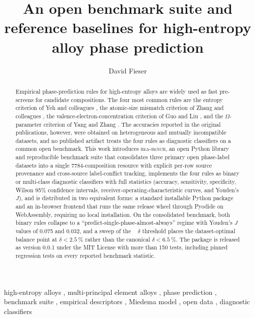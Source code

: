 \documentclass[review,times,nonatbib]{elsarticle}
\newcommand{\Omegaparam}{\ensuremath{\Omega}}
\newcommand{\hea}{\textsc{hea-bench}\xspace}
\begin{document}
\begin{frontmatter}

\title{%
  An open benchmark suite and reference baselines for high-entropy
  alloy phase prediction
}

\author[1]{David Fieser}

\address[1]{Department of Mechanical and Aerospace, University of
Tennessee Knoxville, 1512 Middle Drive, Knoxville, TN 37996, USA.
ORCID \href{https://orcid.org/0009-0007-5754-4331}{0009-0007-5754-4331}}

\begin{abstract}
Empirical phase-prediction rules for high-entropy alloys are widely
used as fast pre-screens for candidate compositions. The four most
common rules are the entropy criterion of Yeh and colleagues
\cite{yeh2004}, the atomic-size mismatch criterion of Zhang and
colleagues \cite{zhang2008}, the valence-electron-concentration
criterion of Guo and Liu \cite{guo2011}, and the
\Omegaparam{}-parameter criterion of Yang and Zhang \cite{yang2012}.
The accuracies reported in the original publications, however, were
obtained on heterogeneous and mutually incompatible datasets, and
no published artifact treats the four rules as diagnostic
classifiers on a common open benchmark. This work introduces
\hea{}, an open Python library and reproducible benchmark suite
that consolidates three primary open phase-label datasets into a
single \num{7784}-composition resource with explicit per-row source
provenance and cross-source label-conflict tracking, implements
the four rules as binary or multi-class diagnostic classifiers with
full statistics (accuracy, sensitivity, specificity, Wilson 95\%
confidence intervals, receiver-operating-characteristic curves, and
Youden's $J$), and is distributed in two equivalent forms: a standard installable
Python package and an in-browser frontend that runs the same
release wheel through Pyodide on WebAssembly, requiring no local
installation. On the
consolidated benchmark, both binary rules collapse to a
``predict-single-phase-almost-always'' regime with Youden's $J$
values of 0.075 and 0.032, and a sweep of the
\citeauthor{zhang2008}~\cite{zhang2008} $\delta$ threshold places
the dataset-optimal balance point at $\delta < \SI{2.5}{\percent}$
rather than the canonical $\delta < \SI{6.5}{\percent}$. The
package is released as version 0.0.1 under the MIT License with
more than 150 tests, including pinned regression tests on every
reported benchmark statistic.
\end{abstract}

\begin{keyword}
high-entropy alloys \sep
multi-principal element alloys \sep
phase prediction \sep
benchmark suite \sep
empirical descriptors \sep
Miedema model \sep
open data \sep
diagnostic classifiers
\end{keyword}

\end{frontmatter}
\end{document}
